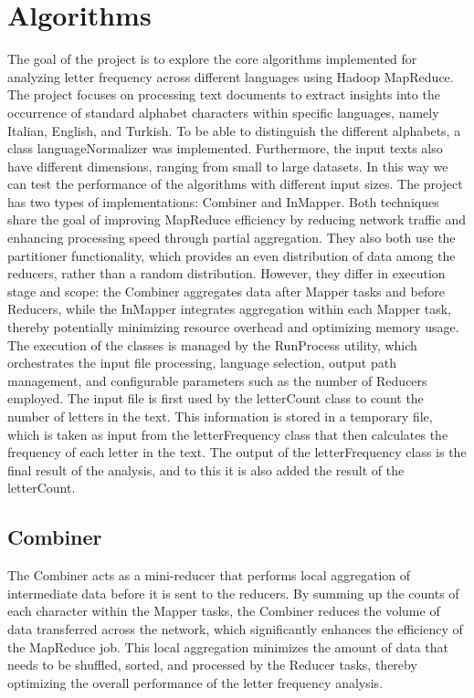 \chapter{Algorithms}


The goal of the project is to explore the core algorithms implemented for analyzing letter frequency across different languages using Hadoop MapReduce. 
The project focuses on processing text documents to extract insights into the occurrence of standard alphabet characters within specific languages, namely Italian, English, and Turkish. 
To be able to distinguish the different alphabets, a class languageNormalizer was implemented. 
Furthermore, the input texts also have different dimensions, ranging from small to large datasets.
In this way we can test the performance of the algorithms with different input sizes.
The project has two types of implementations: Combiner and InMapper. Both techniques share the goal of improving MapReduce efficiency by reducing network traffic and enhancing processing speed through partial aggregation. They also both use the partitioner functionality, which provides an even distribution of data among the reducers, rather than a random distribution. However, they differ in execution stage and scope: the Combiner aggregates data after Mapper tasks and before Reducers, while the InMapper integrates aggregation within each Mapper task, thereby potentially minimizing resource overhead and optimizing memory usage. 
The execution of the classes is managed by the RunProcess utility, which orchestrates the input file processing, language selection, output path management, and configurable parameters such as the number of Reducers employed. The input file is first used by the letterCount class to count the number of letters in the text. This information is stored in a temporary file, which is taken as input from the letterFrequency class that then calculates the frequency of each letter in the text. The output of the letterFrequency class is the final result of the analysis, and to this it is also added the result of the letterCount.

\section{Combiner}

The Combiner acts as a mini-reducer that performs local aggregation of intermediate data before it is sent to the reducers. By summing up the counts of each character within the Mapper tasks, the Combiner reduces the volume of data transferred across the network, which significantly enhances the efficiency of the MapReduce job. This local aggregation minimizes the amount of data that needs to be shuffled, sorted, and processed by the Reducer tasks, thereby optimizing the overall performance of the letter frequency analysis.



